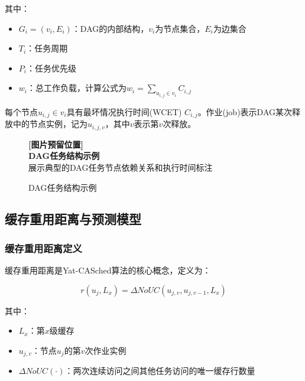 其中：
\begin{tcolorbox}[
    colback=cyan!5!white,
    colframe=cyan!50!black,
    arc=3pt,
    left=5pt,
    right=5pt
]
\begin{itemize}    \item \textbf{$G_i = (v_i, E_i)$}：DAG的内部结构，$v_i$为节点集合，$E_i$为边集合
    \item \textbf{$T_i$}：任务周期
    \item \textbf{$P_i$}：任务优先级
    \item \textbf{$w_i$}：总工作负载，计算公式为$w_i = \sum_{u_{i,j} \in v_i} C_{i,j}$
\end{itemize}
\end{tcolorbox}

每个节点$u_{i,j} \in v_i$具有最坏情况执行时间(WCET) $C_{i,j}$。作业(job)表示DAG某次释放中的节点实例，记为$u_{i,j,v}$，其中$v$表示第$v$次释放。

\begin{figure}[htbp]
\centering
\begin{tcolorbox}[
    colback=gray!10,
    colframe=gray!50,
    width=0.8\textwidth,
    center,
    arc=3pt
]
\centering
\textbf{[图片预留位置]}\\
\textbf{DAG任务结构示例}\\
\footnotesize{展示典型的DAG任务节点依赖关系和执行时间标注}
\end{tcolorbox}
\caption{DAG任务结构示例}
\label{fig:dag_example}
\end{figure}

\subsection{缓存重用距离与预测模型}

\subsubsection{缓存重用距离定义}

缓存重用距离是Yat-CASched算法的核心概念，定义为：

\begin{tcolorbox}[
    colback=purple!5!white,
    colframe=purple!50!black,
    arc=3pt,
    center
]
$$r(u_j, L_x) = \Delta NoUC(u_{j,v}, u_{j,v-1}, L_x)$$
\end{tcolorbox}

其中：
\begin{tcolorbox}[
    colback=pink!10!white,
    colframe=pink!50!black,
    arc=3pt,
    left=5pt,
    right=5pt
]
\begin{itemize}    \item \textbf{$L_x$}：第$x$级缓存
    \item \textbf{$u_{j,v}$}：节点$u_j$的第$v$次作业实例
    \item \textbf{$\Delta NoUC(\cdot)$}：两次连续访问之间其他任务访问的唯一缓存行数量
\end{itemize}
\end{tcolorbox}

